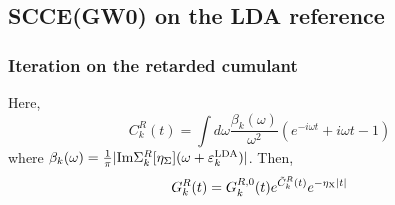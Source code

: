 \subsection{SCCE(GW0) on the LDA reference}
\subsubsection{Iteration on the retarded cumulant}
Here,
\begin{equation}
C_{k}^R(t) = \int d\omega \frac{\beta_{k}(\omega)}{\omega^2} \left( e^{-i\omega t} + i\omega t - 1 \right)
\label{eq:cumulant_beta}
\end{equation}
where $\beta_{k}(\omega) = \frac{1}{\pi} |\text{Im} \Sigma^R_{k}[\eta_{\Sigma}](\omega + \varepsilon_k^{\mathrm{LDA}})|$.
Then,
\begin{equation}
G_k^R(t)=G_k^{R, 0}(t) e^{\tilde{C}_k^R(t)} e^{-\eta_{\rm X} |t|}
\end{equation}
